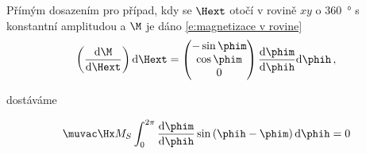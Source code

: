Přímým dosazením pro případ, kdy se $\Hext$ otočí v rovině $xy$ o \SI{360}{\degree} s konstantní amplitudou a $\M$ je dáno \eqref{e:magnetizace v rovine}
\begin{equation}
    \left( \frac{\text{d}\M}{\text{d}\Hext} \right) \text{d}\Hext=\begin{pmatrix}
    -\sin \phim \\ \cos \phim \\ 0
    \end{pmatrix} \frac{\text{d}\phim}{\text{d}\phih}  \text{d}\phih \,,
\end{equation}

dostáváme

\begin{equation} \label{e:M integracni konstanta dodatek}
\muvac\Hx M_S \int_{0}^{2\pi}  \frac{\text{d}\phim}{\text{d}\phih} \sin\left(\phih-\phim\right) \text{d}\phih=0
\end{equation}
